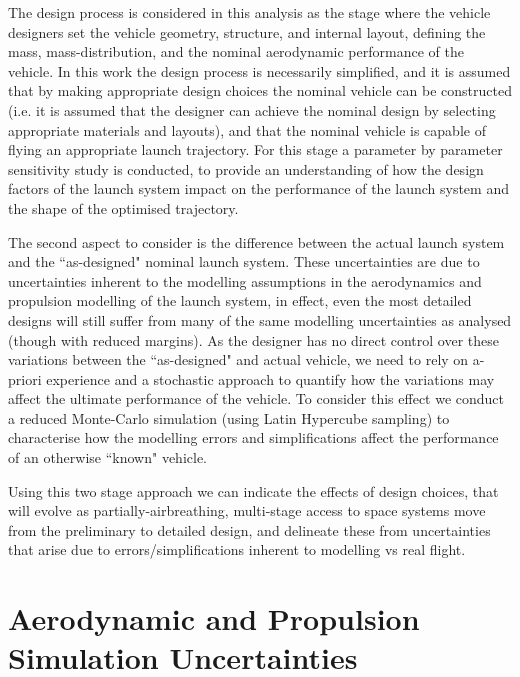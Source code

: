 The design process is considered in this analysis as the stage where the vehicle designers set the vehicle geometry, structure, and internal layout, defining the mass, mass-distribution, and the nominal aerodynamic performance of the vehicle. In this work the design process is necessarily simplified, and it is assumed that by making appropriate design choices the nominal vehicle can be constructed (i.e. it is assumed that the designer can achieve the nominal design by selecting appropriate materials and layouts), and that the nominal vehicle is capable of flying an appropriate launch trajectory. For this stage a parameter by parameter sensitivity study is conducted, to provide an understanding of how the design factors of the launch system impact on the performance of the launch system and the shape of the optimised trajectory. 



The second aspect to consider is the difference between the actual launch system and the ``as-designed" nominal launch system. These uncertainties are due to uncertainties inherent to the modelling assumptions in the aerodynamics and propulsion modelling of the launch system, in effect, even the most detailed designs will still suffer from many of the same modelling uncertainties as analysed (though with reduced margins). 
As the designer has no direct control over these variations between the ``as-designed" and actual vehicle, we need to rely on a-priori experience and a stochastic approach to quantify how the variations may affect the ultimate performance of the vehicle. To consider this effect we conduct a reduced Monte-Carlo simulation (using Latin Hypercube sampling) to characterise how the modelling errors and simplifications affect the performance of an otherwise ``known" vehicle. 


Using this two stage approach we can indicate the effects of design choices, that will evolve as partially-airbreathing, multi-stage access to space systems move from the preliminary to detailed design, and delineate these from uncertainties that arise due to errors/simplifications inherent to modelling vs real flight. 








\section{Aerodynamic and Propulsion Simulation Uncertainties}


